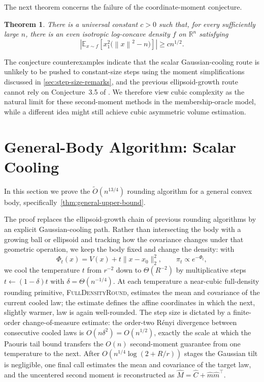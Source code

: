 \documentclass[11pt]{article}
\numberwithin{equation}{section}
\newtheorem{theorem}{Theorem}
\theoremstyle{definition}
\newcommand{\R}{\mathbb{R}}
\renewcommand{\O}{\widetilde{O}}
\newcommand{\E}[2]{\mathbb{E}_{#1}\left[#2\right]}
\newcommand{\norm}[1]{\left\lVert#1\right\rVert}
\newcommand{\algname}[1]{\textnormal{\textsc{#1}}}
\begin{document}
The next theorem concerns the failure of the coordinate-moment conjecture.

\begin{theorem}
\label{thm:coordinate-moment-counterexample}
There is a universal constant $c>0$ such that, for every sufficiently large
$n$, there is an even isotropic log-concave density
$f$ on
$\R^n$ satisfying
\[
  \left|\E{x\sim f}{x_1^2\bigl(\norm{x}^2-n\bigr)}\right|
  \geq cn^{1/2}.
\]
\end{theorem}

The conjecture counterexamples indicate that the scalar Gaussian-cooling route
is unlikely to be pushed to constant-size steps using
the moment simplifications discussed in \cref{sec:step-size-remarks},
and the previous ellipsoid-growth route cannot rely on Conjecture~3.5 of \cite{JLLV26:journal}.
We therefore view cubic complexity as the natural limit for these second-moment
methods in the membership-oracle model, while a different idea might still
achieve cubic asymmetric volume estimation.

\section{General-Body Algorithm: Scalar Cooling}
\label{sec:asymmetric}

In this section we prove the $\O(n^{13/4})$ rounding algorithm for a general
convex body, specifically~\cref{thm:general-upper-bound}.

The proof replaces the ellipsoid-growth chain of previous rounding algorithms by
an explicit Gaussian-cooling path.
Rather than intersecting the body with a growing ball or ellipsoid and tracking
how the covariance changes under that geometric operation, we keep the body
fixed and change the density: with
\[
\Phi_t(x)=V(x)+t\|x-x_0\|_2^2,
\qquad
\pi_t\propto e^{-\Phi_t},
\]
we cool the temperature $t$ from
$r^{-2}$ down to
$\Theta(R^{-2})$ by multiplicative steps
$t\leftarrow(1-\delta)t$ with
$\delta=\Theta(n^{-1/4})$.
At each temperature a near-cubic full-density rounding primitive,
\algname{FullDensityRound}, estimates the mean and covariance of the current
cooled law; the estimate defines the affine coordinates in which the next,
slightly warmer, law is again well-rounded.
The step size is dictated by a finite-order change-of-measure estimate: the
order-two R\'enyi divergence between consecutive cooled laws is
$O(n\delta^2)=O(n^{1/2})$, exactly the scale at which the Paouris tail bound
transfers the
$O(n)$ second-moment guarantee from one temperature to the next.
After $O(n^{1/4}\log(2+R/r))$ stages the Gaussian tilt is negligible, one final
call estimates the mean and covariance of the target law, and the uncentered
second moment is reconstructed as
$\widehat M=\widehat C+\widehat m\widehat m^\top$.
\end{document}
